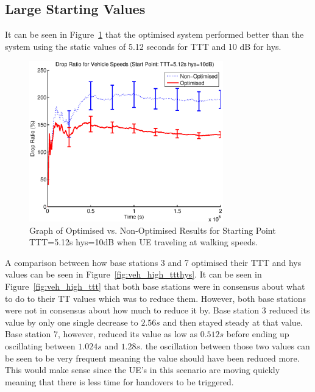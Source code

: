 \subsection{Large Starting Values}
It can be seen in Figure~\ref{fig:veh_high_drop} that the optimised system performed better than the system using the static values of 5.12 seconds for TTT and 10 dB for hys. 
\begin{figure}[H]
  \begin{center}
    	  \includegraphics[width=0.75\textwidth]{figures/vehicle_figures/vehhigh.eps}
    \end{center}
    \caption{Graph of Optimised vs. Non-Optimised Results for Starting Point TTT=5.12s hys=10dB when UE traveling at walking speeds.}
    \label{fig:veh_high_drop}
\end{figure}
A comparison between how base stations 3 and 7 optimised their TTT and hys values can be seen in Figure~\ref{fig:veh_high_ttthys}. It can be seen in Figure~\ref{fig:veh_high_ttt} that both base stations were in consensus about what to do to their TT values which was to reduce them. However, both base stations were not in consensus about how much to reduce it by. Base station 3 reduced its value by only one single decrease to $2.56 s$ and then stayed steady at that value. Base station 7, however, reduced its value as low as $0.512 s$ before ending up oscillating between $1.024 s$ and $1.28 s$. the oscillation between those two values can be seen to be very frequent meaning the value should have been reduced more. This would make sense since the UE’s in this scenario are moving quickly meaning that there is less time for handovers to be triggered.

